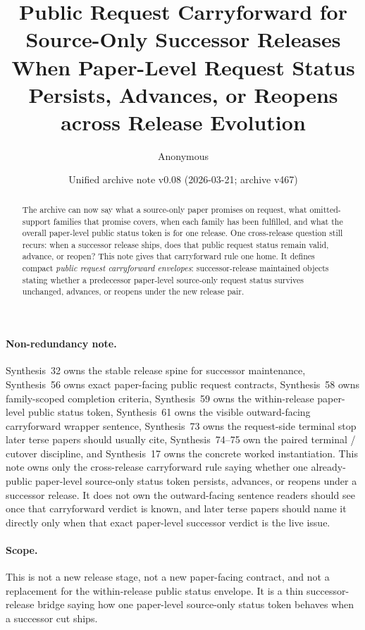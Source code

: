 \documentclass[11pt]{article}
\title{Public Request Carryforward for Source-Only Successor Releases\\\large When Paper-Level Request Status Persists, Advances, or Reopens across Release Evolution}
\author{Anonymous}
\date{Unified archive note v0.08 (2026-03-21; archive v467)}
\begin{document}
\maketitle

\begin{abstract}
The archive can now say what a source-only paper promises on request, what omitted-support families that promise covers, when each family has been fulfilled, and what the overall paper-level public status token is for one release. One cross-release question still recurs: when a successor release ships, does that public request status remain valid, advance, or reopen? This note gives that carryforward rule one home. It defines compact \emph{public request carryforward envelopes}: successor-release maintained objects stating whether a predecessor paper-level source-only request status survives unchanged, advances, or reopens under the new release pair.
\end{abstract}

\paragraph{Non-redundancy note.}
Synthesis~32 owns the stable release spine for successor maintenance, Synthesis~56 owns exact paper-facing public request contracts, Synthesis~58 owns family-scoped completion criteria, Synthesis~59 owns the within-release paper-level public status token, Synthesis~61 owns the visible outward-facing carryforward wrapper sentence, Synthesis~73 owns the request-side terminal stop later terse papers should usually cite, Synthesis~74--75 own the paired terminal / cutover discipline, and Synthesis~17 owns the concrete worked instantiation.\cite{series:releasespine,series:publicrequestcontracts,series:requestfulfillmentcertificates,series:publicrequeststatusenvelopes,series:publicrequestnotices,series:publicrequestresponsepacketrefreshresponsepacketclosureverdicts,series:pairedterminalcitationdiscipline,series:pairedterminalcutoverrule,series:workedexample}
This note owns only the cross-release carryforward rule saying whether one already-public paper-level source-only status token persists, advances, or reopens under a successor release. It does not own the outward-facing sentence readers should see once that carryforward verdict is known, and later terse papers should name it directly only when that exact paper-level successor verdict is the live issue.

\paragraph{Scope.}
This is not a new release stage, not a new paper-facing contract, and not a replacement for the within-release public status envelope.
It is a thin successor-release bridge saying how one paper-level source-only status token behaves when a successor cut ships.
\end{document}
